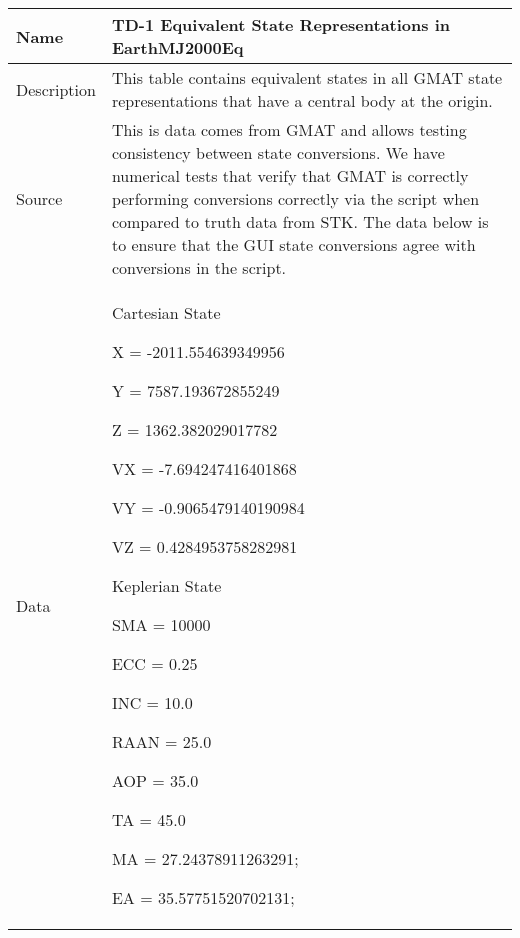 
\begin{table}[htbp!]
\centering
      \begin{tabular}{|p{1.0 in} |p{5.0 in} |}
         \hline
          \rowcolor[rgb]{0.8,0.8,0.8}  Name & TD-1 Equivalent State Representations in EarthMJ2000Eq\\
         \hline
         Description & This table contains equivalent states in all GMAT state representations
         that have a central body at the origin.    \\ \hline
         Source &  This is data comes from GMAT and allows testing consistency between state conversions.  We have numerical tests
         that verify that GMAT is correctly performing conversions correctly via the script when compared to
         truth data from STK.  The data below is to ensure that the GUI state conversions agree with conversions in the script. \\
         \hline
         Data &
          \begin{compactenum}
              \item Cartesian State
              \begin{compactenum}
                  \item X = -2011.554639349956
                  \item Y = 7587.193672855249
                  \item Z = 1362.382029017782
                  \item VX = -7.694247416401868
                  \item VY = -0.9065479140190984
                  \item VZ = 0.4284953758282981
              \end{compactenum}
              \item Keplerian State
              \begin{compactenum}
                  \item SMA = 10000
                  \item ECC = 0.25
                  \item INC = 10.0
                  \item RAAN = 25.0
                  \item AOP = 35.0
                  \item TA = 45.0
                  \item MA = 27.24378911263291;
                  \item EA = 35.57751520702131;

\end{compactenum}
\end{compactenum}
\end{tabular}
\end{table}
